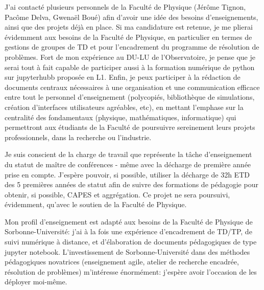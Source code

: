 \pg
J'ai contact\'e plusieurs personnels de la Facult\'e de Physique (J\'er\^ome Tignon, Pac\^ome Delva, Gwena\"el Bou\'e) afin d'avoir une id\'ee des besoins d'enseignements, ainsi que des projets d\'ej\`a en place. Si ma candidature est retenue, je me plierai \'evidemment aux besoins de la Facult\'e de Physique, en particulier en termes de gestions de groupes de TD et pour l'encadrement du programme de r\'esolution de probl\`emes. Fort de mon exp\'erience au DU-LU de l'Observatoire, je pense que je serai tout \`a fait capable de participer aussi \`a la formation num\'erique de python sur jupyterhubb propos\'ee en L1. Enfin, je peux participer \`a la r\'edaction de documents centraux n\'ecessaires \`a une organisation et une communication efficace entre tout le personnel d'enseignement (polycopi\'es, biblioth\`eque de simulations, cr\'eation d'interfaces utilisateurs agr\'eables, etc), en mettant l'emphase sur la centralit\'e des fondamentaux (physique, math\'ematiques, informatique) qui permettront aux \'etudiants de la Facult\'e de poursuivre sereinement leurs projets professionnels, dans la recherche ou l'industrie.

\pg
Je suis conscient de la charge de travail que repr\'esente la t\^ache d'enseignement du statut de ma\^itre de conf\'erences - m\^eme avec la d\'echarge de premi\`ere ann\'ee prise en compte. J'esp\`ere pouvoir, si possible, utiliser la d\'echarge de 32h ETD des 5 premi\`eres ann\'ees de statut afin de suivre des formations de p\'edagogie pour obtenir, si possible, CAPES et aggr\'egation. Ce projet ne sera poursuivi, \'evidemment, qu'avec le soutien de la Facult\'e de Physique.

\begin{tcolorbox}[colback=green!10, colframe=green!50!black, arc=3mm, boxrule=1pt]
	Mon profil d'enseignement est adapt\'e aux besoins de la Facult\'e de Physique de Sorbonne-Universit\'e: j'ai \`a la fois une exp\'erience d'encadrement de TD/TP, de suivi num\'erique \`a distance, et d'\'elaboration de documents p\'edagogiques de type jupyter notebook. L'investissement de Sorbonne-Universit\'e dans des m\'ethodes p\'edagogiques novatrices (enseignement agile, atelier de recherche encadr\'ee, r\'esolution de probl\`emes) m'int\'eresse \'enorm\'ement: j'esp\`ere avoir l'occasion de les d\'eployer moi-m\^eme.
\end{tcolorbox}







